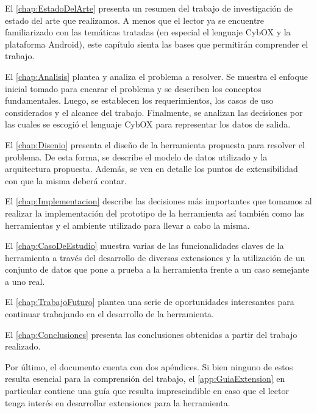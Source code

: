El \autoref{chap:EstadoDelArte} presenta un resumen del trabajo de investigación de estado del arte que realizamos. A menos que el lector ya se encuentre familiarizado con las temáticas tratadas (en especial el lenguaje CybOX y la plataforma Android), este capítulo sienta las bases que permitirán comprender el trabajo.

El \autoref{chap:Analisis} plantea y analiza el problema a resolver. Se muestra el enfoque inicial tomado para encarar el problema y se describen los conceptos fundamentales. Luego, se establecen los requerimientos, los casos de uso considerados y el alcance del trabajo. Finalmente, se analizan las decisiones por las cuales se escogió el lenguaje CybOX para representar los datos de salida.

El \autoref{chap:Disenio} presenta el diseño de la herramienta propuesta para resolver el problema. De esta forma, se describe el modelo de datos utilizado y la arquitectura propuesta. Además, se ven en detalle los puntos de extensibilidad con que la misma deberá contar.

El \autoref{chap:Implementacion} describe las decisiones más importantes que tomamos al realizar la implementación del prototipo de la herramienta así también como las herramientas y el ambiente utilizado para llevar a cabo la misma.

El \autoref{chap:CasoDeEstudio} muestra varias de las funcionalidades claves de la herramienta a través del desarrollo de diversas extensiones y la utilización de un conjunto de datos que pone a prueba a la herramienta frente a un caso semejante a uno real.

El \autoref{chap:TrabajoFuturo} plantea una serie de oportunidades interesantes para continuar trabajando en el desarrollo de la herramienta.

El \autoref{chap:Conclusiones} presenta las conclusiones obtenidas a partir del trabajo realizado.

Por último, el documento cuenta con dos apéndices. Si bien ninguno de estos resulta esencial para la comprensión del trabajo, el \autoref{app:GuiaExtension} en particular contiene una guía que resulta imprescindible en caso que el lector tenga interés en desarrollar extensiones para la herramienta.